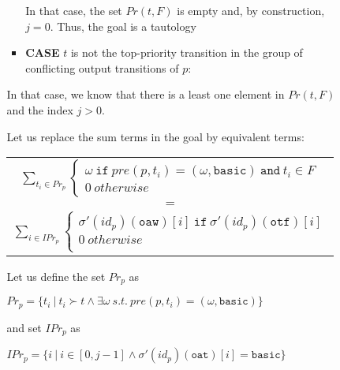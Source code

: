 \documentclass[dvipsnames,12pt]{article}
\begin{document}
\begin{niproof}
\begin{enumerate}
\begin{itemize}
\begin{itemize}
\begin{itemize}
          In that case, the set $Pr(t,F)$ is empty and, by
          construction, $j=0$. Thus, the goal is a tautology
          
        \item \textbf{CASE} $t$ is not the top-priority transition
          in the group of conflicting output transitions of $p$:
        \end{itemize}
        In that case, we know that there is a least one element
        in $Pr(t,F)$ and the index $j>0$.

        Let us replace the sum terms in the goal by equivalent terms:
        \begin{frameb}
          \begin{tabular}{c}
            $\sum\limits_{t_i\in{}Pr_p}
            \begin{cases}
              \omega~\mathtt{if}~pre(p,t_i)=(\omega,\mathtt{basic})~\mathtt{and}~t_i\in{}F\\
              0~otherwise
            \end{cases}$ \\
            $=$ \\
            $\sum\limits_{i\in{}IPr_p}
            \begin{cases}
              \sigma'(id_p)(\texttt{oaw})[i]~\mathtt{if}~\sigma'(id_p)(\texttt{otf})[i]\\
              0~otherwise\\
            \end{cases}$ \\
          \end{tabular}
        \end{frameb}

        Let us define the set $Pr_p$ as
        \begin{center}
          $Pr_p=\{t_i~\vert~t_i\succ{}t\land\exists{}\omega~s.t.~pre(p,t_i)=(\omega,\mathtt{basic})\}$
        \end{center}
        and set $IPr_p$ as
        \begin{center}
          $IPr_p=\{i~\vert~i\in[0,j-1]\land\sigma'(id_p)(\texttt{oat})[i]=\texttt{basic}\}$
        \end{center}


\end{itemize}
\end{itemize}
\end{enumerate}
\end{niproof}
\end{document}
